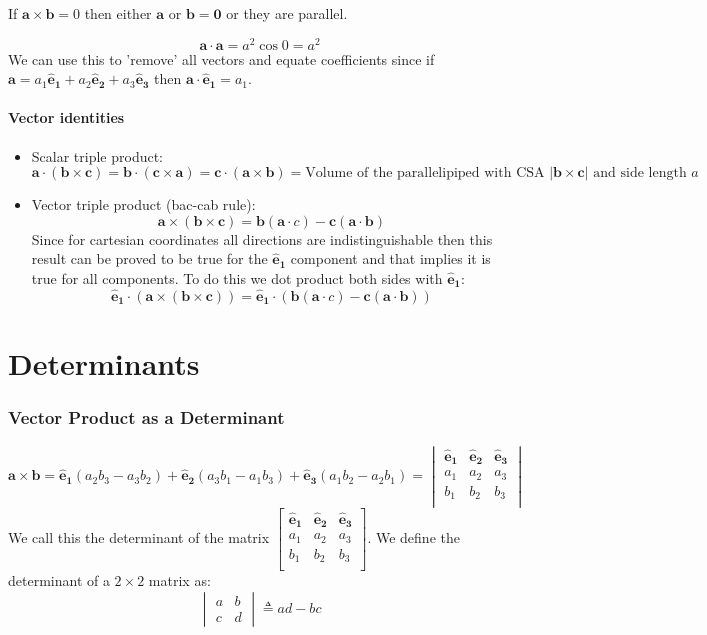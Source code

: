\documentclass{article}
\renewcommand{\vec}[1]{\bm{#1}}
\newcommand{\vv}[1]{\vec{#1}}
\newcommand{\ve}[1]{\vec{\hat{e}_{#1}}}
\begin{document}
If \(\vv a\times\vv b=0\) then either \(\vv a\) or \(\vv b =\vv 0\) or they are parallel.

\[\vv a\cdot\vv a=a^2\cos 0=a^2\]
We can use this to 'remove' all vectors and equate coefficients since if \(\vv a=a_1\ve1+a_2\ve2+a_3\ve3\) then \(\vv a\cdot\ve1=a_1\).

\subsection*{Vector identities}

\begin{itemize}
\item Scalar triple product:
\[\vv a\cdot(\vv b\times\vv c)=\vv b\cdot(\vv c\times \vv a)=\vv c\cdot(\vv a\times\vv b)=\text{Volume of the parallelipiped with CSA \(|\vv b\times\vv c|\) and side length \(a\)}\]
\item Vector triple product (bac-cab rule):
\[\vv a\times(\vv b\times\vv c)=\vv b(\vv a\cdot c)-\vv c(\vv a\cdot\vv b)\]
Since for cartesian coordinates all directions are indistinguishable then this result can be proved to be true for the \(\ve1\) component and that implies it is true for all components. To do this we dot product both sides with \(\ve1\):
\[\ve1\cdot(\vv a\times(\vv b\times\vv c))=\ve1\cdot(\vv b(\vv a\cdot c)-\vv c(\vv a\cdot\vv b))\]
\end{itemize}

\part{Determinants}
\section{Vector Product as a Determinant}

\[\vv a\times\vv b=\ve 1 (a_2b_3-a_3b_2)+\ve 2 (a_3b_1-a_1b_3)+\ve 3 (a_1b_2-a_2b_1)=
\begin{vmatrix}
\ve1 & \ve2 & \ve3\\
a_1 & a_2 & a_3\\
b_1 & b_2 & b_3\\
\end{vmatrix}
\]
We call this the determinant of the matrix 
\(\left[
\begin{smallmatrix}
\ve1 & \ve2 & \ve3\\
a_1 & a_2 & a_3\\
b_1 & b_2 & b_3\\
\end{smallmatrix}
\right]\).
We define the determinant of a \(2\times2\) matrix as:
\[\begin{vmatrix}
a & b\\
c & d
\end{vmatrix}
\triangleq ad-bc\]
\end{document}
